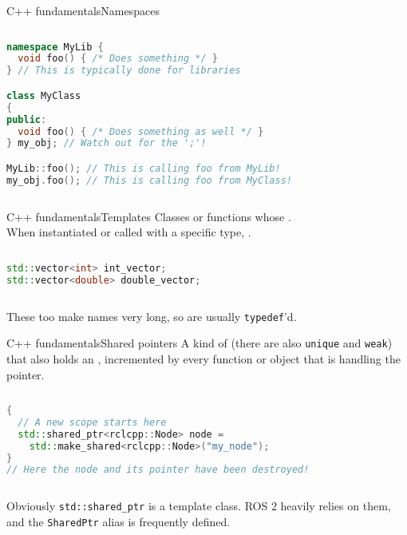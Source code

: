 \begin{frame}[fragile]{C++ fundamentals}{Namespaces}
	\begin{columns}
		\begin{lstlisting}[language=C++, caption=Example of namespaces usage.]
namespace MyLib {
  void foo() { /* Does something */ }
} // This is typically done for libraries

class MyClass
{
public:
  void foo() { /* Does something as well */ }
} my_obj; // Watch out for the ';'!

MyLib::foo(); // This is calling foo from MyLib!
my_obj.foo(); // This is calling foo from MyClass!\end{lstlisting}
	\end{columns}
\end{frame}
\begin{frame}[fragile]{C++ fundamentals}{Templates}
	Classes or functions whose .\\
  When instantiated or called with a specific type, .
  \vspace{.5cm}
	\begin{columns}
		\column{.9\textwidth}
		\begin{lstlisting}[language=C++, caption=Example of objects of the template class \texttt{std::vector}.]
std::vector<int> int_vector;
std::vector<double> double_vector;\end{lstlisting}
	\end{columns}
  \vspace{.5cm}
	These too make names very long, so are usually \texttt{typedef}'d.
\end{frame}
\begin{frame}[fragile]{C++ fundamentals}{Shared pointers}
	A kind of  (there are also \texttt{unique} and \texttt{weak}) that also holds an , incremented by every function or object that is handling the pointer.\\
  \vspace{.1cm}
	\begin{columns}
		\begin{lstlisting}[language=C++, caption=Example of shared pointer creation.]
{
  // A new scope starts here
  std::shared_ptr<rclcpp::Node> node =
    std::make_shared<rclcpp::Node>("my_node");
}
// Here the node and its pointer have been destroyed!\end{lstlisting}
	\end{columns}
  \vspace{.1cm}
	Obviously \texttt{std::shared\_ptr} is a template class. ROS 2 heavily relies on them, and the \texttt{SharedPtr} alias is frequently defined.
\end{frame}
